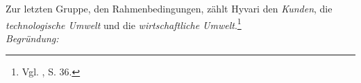 Zur letzten Gruppe, den Rahmenbedingungen, zählt Hyvari den \textit{Kunden}, die \textit{technologische Umwelt} und die \textit{wirtschaftliche Umwelt}.\footnote{Vgl. \cite{Hyvari.2006}, S. 36.}
\\
\noindent\textit{Begründung:}\\\noindent
{}



